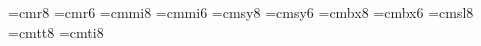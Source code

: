  
\ifx\tenpoint\undefined\let\loadedfrommacro=Y
         
         \let\loadedfrommacro=N\fi
 
\font\eightrm=cmr8           \font\sixrm=cmr6
\font\eighti=cmmi8           \font\sixi=cmmi6
\font\eightsy=cmsy8          \font\sixsy=cmsy6
\font\eightbf=cmbx8          \font\sixbf=cmbx6
\font\eightsl=cmsl8          \font\eighttt=cmtt8    \font\eightit=cmti8
\ifx\eightpoint\undefined
   \def\eightpoint{\def\rm{\fam0\eightrm} %
       \textfont0=\eightrm  \scriptfont0=\sixrm  \scriptscriptfont0=\fiverm
       \textfont1=\eighti   \scriptfont1=\sixi   \scriptscriptfont1=\fivei
       \textfont2=\eightsy  \scriptfont2=\sixsy  \scriptscriptfont2=\fivesy
       \textfont3=\tenex    \scriptfont3=\tenex  \scriptscriptfont3=\tenex
       \textfont\itfam=\eightit   \def\it{\fam\itfam\eightit}%
       \textfont\slfam=\eightsl   \def\sl{\fam\slfam\eightsl}%
       \textfont\ttfam=\eighttt   \def\tt{\fam\ttfam\eighttt}%
       \textfont\bffam=\eightbf   \scriptfont\bffam=\sixbf
        \scriptscriptfont\bffam=\fivebf   \def\bf{\fam\bffam\eightbf}%
       \normalbaselineskip=10pt
       \setbox\strutbox=\hbox{\vrule height7.5pt depth2.5pt width0pt}%
       \normalbaselines\rm}
   \fi
